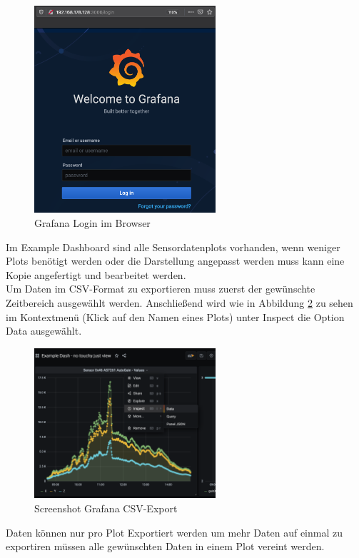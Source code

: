 \begin{figure}[H]
\centering
\includegraphics[width=0.6\textwidth]{img/handbuch/grafna_login}
\caption{Grafana Login im Browser}
\label{fig:grafna_login}
\end{figure}
Im Example Dashboard sind alle Sensordatenplots vorhanden, wenn weniger Plots benötigt werden oder die Darstellung angepasst werden muss kann eine Kopie angefertigt und bearbeitet werden.\\
Um Daten im CSV-Format zu exportieren muss zuerst der gewünschte Zeitbereich ausgewählt werden.
Anschließend wird wie in Abbildung \ref{fig:export_data} zu sehen im Kontextmenü (Klick auf den Namen eines Plots) unter Inspect die Option Data ausgewählt. 

\begin{figure}[H]
\centering
\includegraphics[width=0.6\textwidth]{img/handbuch/Export_Data}
\caption{Screenshot Grafana CSV-Export}
\label{fig:export_data}
\end{figure}
\noindent Daten können nur pro Plot Exportiert werden um mehr Daten auf einmal zu exportiren müssen alle gewünschten Daten in einem Plot vereint werden.

